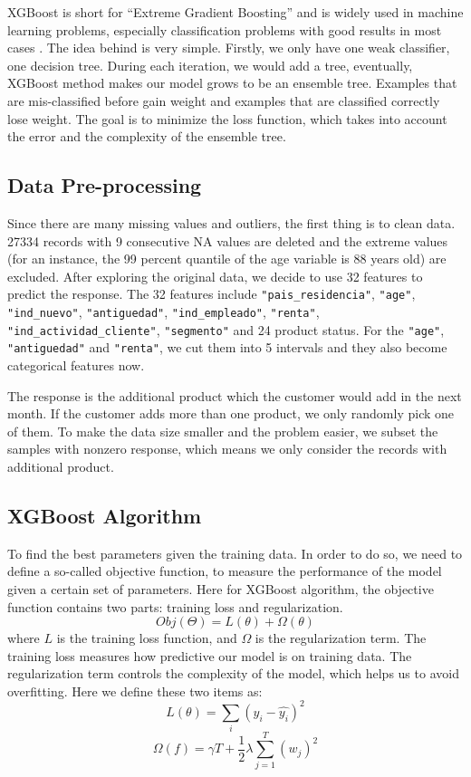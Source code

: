 \documentclass{article}
\begin{document}
\begin{spacing}{1}
\begin{large}
\noindent \indent XGBoost is short for ``Extreme Gradient Boosting” and is widely used in machine learning problems, especially classification problems with good results in most cases \cite{xg1}\cite{xg2}. The idea behind is very simple. Firstly, we only have one weak classifier, one decision tree. During each iteration, we would add a tree, eventually, XGBoost method makes our model grows to be an ensemble tree. Examples that are mis-classified before gain weight and examples that are classified correctly lose weight. The goal is to minimize the loss function, which takes into account the error and the complexity of the ensemble tree.

\subsection{Data Pre-processing}

\noindent \indent Since there are many missing values and outliers, the first thing is to clean data. 27334 records with 9 consecutive NA values are deleted and the extreme values (for an instance, the 99 percent quantile of the age variable is 88 years old) are excluded. After exploring the original data, we decide to use 32 features to predict the response. The 32 features include \verb|"pais_residencia"|, \verb|"age"|, \verb|"ind_nuevo"|, \verb|"antiguedad"|, \verb|"ind_empleado"|, \verb|"renta"|, \verb|"ind_actividad_cliente"|, \verb|"segmento"| and 24 product status. For the \verb|"age"|, \verb|"antiguedad"| and \verb|"renta"|, we cut them into 5 intervals and they also become categorical features now. 

The response is the additional product which the customer would add in the next month. If the customer adds more than one product, we only randomly pick one of them. To make the data size smaller and the problem easier, we subset the samples with nonzero response, which means we only consider the records with additional product.

\subsection{XGBoost Algorithm}

\noindent \indent To find the best parameters given the training data. In order to do so, we need to define a so-called objective function, to measure the performance of the model given a certain set of parameters. Here for XGBoost algorithm, the objective function contains two parts: training loss and regularization.
\[
Obj(\Theta) = L(\theta) + \Omega(\theta)
\]
where $L$ is the training loss function, and $\Omega$ is the regularization term. The training loss measures how predictive our model is on training data. The regularization term controls the complexity of the model, which helps us to avoid overfitting. Here we define these two items as:
\[
L(\theta) = \sum_{i}(y_i - \hat{y_i})^2
\]
\[
\Omega(f) = \gamma T + \frac{1}{2}\lambda\sum_{j = 1}^{T}(w_j)^2
\]
 




\end{large}
\end{spacing}
\end{document}
